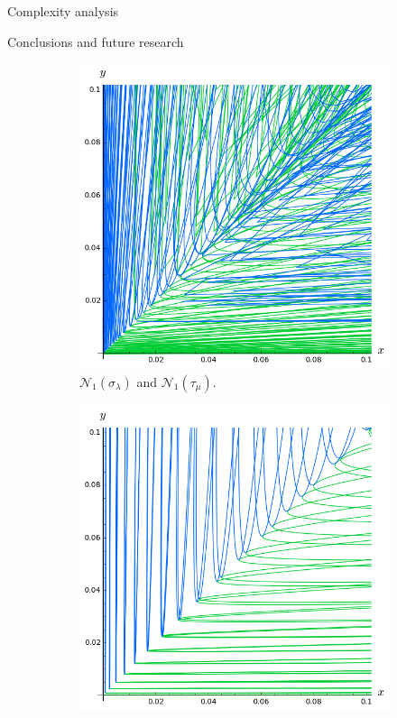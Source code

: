\documentclass[11pt, a4paper, english, twoside, notitlepage, openright]{report}
\begin{document}
\begin{chapter}{Complexity analysis}
\begin{section}{Conclusions and future research}
\begin{figure}
\hspace{0.4cm}
\begin{subfigure}{.45\linewidth}\centering
\includegraphics[width=1\textwidth]{plots/ch5_32_4curves2.png}
\vspace{-0.4cm}\caption{$\mathcal{N}_1(\sigma_{\lambda})$ and $\mathcal{N}_1(\tau_{\mu})$.\label{fig:4curves1}}
\end{subfigure}
\begin{subfigure}{.45\linewidth}\centering
\includegraphics[width=1\textwidth]{plots/ch5_33_4curves3.png}

\end{subfigure}
\end{figure}
\end{section}
\end{chapter}
\end{document}
